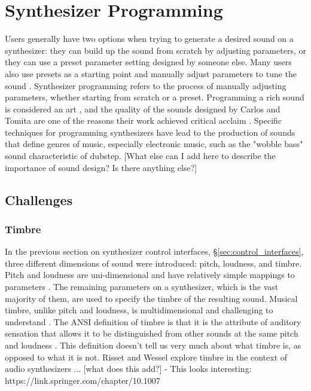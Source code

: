 \section{Synthesizer Programming}
Users generally have two options when trying to generate a desired sound on a synthesizer: they can build up the sound from scratch by adjusting parameters, or they can use a preset parameter setting designed by someone else. Many users also use presets as a starting point and manually adjust parameters to tune the sound \cite{krekovic2019insights}. Synthesizer programming refers to the process of manually adjusting parameters, whether starting from scratch or a preset. Programming a rich sound is considered an art \cite{russ2012sound}, and the quality of the sounds designed by Carlos and Tomita are one of the reasons their work achieved critical acclaim \cite{jenkins2019analog}. Specific techniques for programming synthesizers have lead to the production of sounds that define genres of music, especially electronic music, such as the "wobble bass" sound characteristic of dubstep. [What else can I add here to describe the importance of sound design? Is there anything else?]

\subsection{Challenges}
\subsubsection{Timbre}
In the previous section on synthesizer control interfaces, \S\ref{sec:control_interfaces}, three different dimensions of sound were introduced: pitch, loudness, and timbre. Pitch and loudness are uni-dimensional and have relatively simple mappings to parameters \cite{seago2004critical}. The remaining parameters on a synthesizer, which is the vast majority of them, are used to specify the timbre of the resulting sound. Musical timbre, unlike pitch and loudness, is multidimensional and challenging to understand \cite{krumhansl1989musical}. The ANSI definition of timbre is that it is the attribute of auditory sensation that allows it to be distinguished from other sounds at the same pitch and loudness \cite{american1973american}. This definition doesn't tell us very much about what timbre is, as opposed to what it is not. Risset and Wessel \cite{risset1999exploration} explore timbre in the context of audio synthesizers ... [what does this add?]
- This looks interesting: https://link.springer.com/chapter/10.1007%

